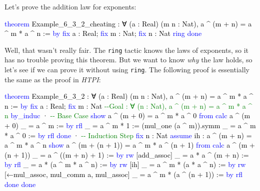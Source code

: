 \documentclass[
  letterpaper,
  DIV=11,
  numbers=noendperiod]{scrreprt}
\newenvironment{Shaded}{\begin{snugshade}}{\end{snugshade}}
\newcommand{\CommentTok}[1]{\textcolor[rgb]{0.37,0.37,0.37}{#1}}
\newcommand{\KeywordTok}[1]{\textcolor[rgb]{0.00,0.23,0.31}{#1}}
\newcommand{\NormalTok}[1]{\textcolor[rgb]{0.00,0.23,0.31}{#1}}
\renewcommand{\NormalTok}[1]{\textcolor[HTML]{000000}{#1}}
\renewcommand{\KeywordTok}[1]{\textcolor[HTML]{0000FF}{#1}}
\renewcommand{\CommentTok}[1]{\textcolor[HTML]{008000}{#1}}
\theoremstyle{remark}
\begin{document}
Let's prove the addition law for exponents:

\begin{Shaded}
\begin{Highlighting}[]
\KeywordTok{theorem}\NormalTok{ Example\_6\_3\_2\_cheating : ∀ (a : Real) (m n : Nat),}
\NormalTok{    a \^{} (m + n) = a \^{} m * a \^{} n := }\KeywordTok{by}
  \KeywordTok{fix}\NormalTok{ a : Real; }\KeywordTok{fix}\NormalTok{ m : Nat; }\KeywordTok{fix}\NormalTok{ n : Nat}
  \KeywordTok{ring}
  \KeywordTok{done}
\end{Highlighting}
\end{Shaded}

Well, that wasn't really fair. The \texttt{ring} tactic knows the laws
of exponents, so it has no trouble proving this theorem. But we want to
know \emph{why} the law holds, so let's see if we can prove it without
using \texttt{ring}. The following proof is essentially the same as the
proof in \emph{HTPI}:

\begin{Shaded}
\begin{Highlighting}[]
\KeywordTok{theorem}\NormalTok{ Example\_6\_3\_2 : ∀ (a : Real) (m n : Nat),}
\NormalTok{    a \^{} (m + n) = a \^{} m * a \^{} n := }\KeywordTok{by}
  \KeywordTok{fix}\NormalTok{ a : Real; }\KeywordTok{fix}\NormalTok{ m : Nat}
    \CommentTok{{-}{-}Goal : ∀ (n : Nat), a \^{} (m + n) = a \^{} m * a \^{} n}
  \KeywordTok{by\_induc}
\NormalTok{  · }\CommentTok{{-}{-} Base Case}
    \KeywordTok{show}\NormalTok{ a \^{} (m + 0) = a \^{} m * a \^{} 0 }\KeywordTok{from}
      \KeywordTok{calc}\NormalTok{ a \^{} (m + 0)}
\NormalTok{        \_ = a \^{} m := }\KeywordTok{by} \KeywordTok{rfl}
\NormalTok{        \_ = a \^{} m * 1 := (mul\_one (a \^{} m)).symm}
\NormalTok{        \_ = a \^{} m * a \^{} 0 := }\KeywordTok{by} \KeywordTok{rfl}
    \KeywordTok{done}
\NormalTok{  · }\CommentTok{{-}{-} Induction Step}
    \KeywordTok{fix}\NormalTok{ n : Nat}
    \KeywordTok{assume}\NormalTok{ ih : a \^{} (m + n) = a \^{} m * a \^{} n}
    \KeywordTok{show}\NormalTok{ a \^{} (m + (n + 1)) = a \^{} m * a \^{} (n + 1) }\KeywordTok{from}
      \KeywordTok{calc}\NormalTok{ a \^{} (m + (n + 1))}
\NormalTok{        \_ = a \^{} ((m + n) + 1) := }\KeywordTok{by} \KeywordTok{rw}\NormalTok{ [add\_assoc]}
\NormalTok{        \_ = a * a \^{} (m + n) := }\KeywordTok{by} \KeywordTok{rfl}
\NormalTok{        \_ = a * (a \^{} m * a \^{} n) := }\KeywordTok{by} \KeywordTok{rw}\NormalTok{ [ih]}
\NormalTok{        \_ = a \^{} m * (a * a \^{} n) := }\KeywordTok{by}
              \KeywordTok{rw}\NormalTok{ [←mul\_assoc, mul\_comm a, mul\_assoc]}
\NormalTok{        \_ = a \^{} m * (a \^{} (n + 1)) := }\KeywordTok{by} \KeywordTok{rfl}
    \KeywordTok{done}
  \KeywordTok{done}
\end{Highlighting}
\end{Shaded}
\end{document}
